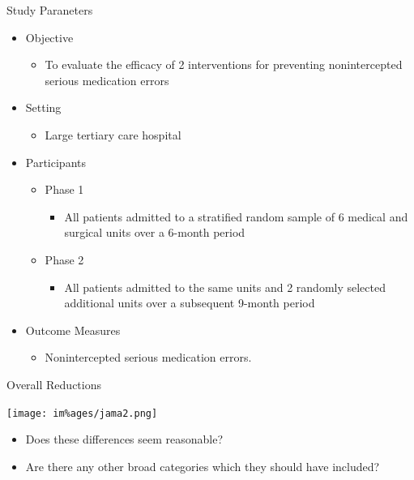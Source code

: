 \documentclass[10pt]{beamer}
\begin{document}
\begin{frame}{Study Paraneters}
	\begin{itemize}
		\item Objective
		\begin{itemize}
			\item To evaluate the efficacy of 2 interventions for preventing nonintercepted serious medication errors
		\end{itemize}
		\item Setting
		\begin{itemize}
			\item Large tertiary care hospital
		\end{itemize}
		\item Participants
		\begin{itemize}
			\item Phase 1 
			\begin{itemize}
				\item All patients admitted to a stratified random sample of 6 medical and surgical units over a 6-month period
			\end{itemize}
			\item Phase 2  
			\begin{itemize}
				\item All patients admitted to the same units and 2 randomly selected additional units over a subsequent 9-month period
			\end{itemize}
		\end{itemize}
		\item Outcome Measures
		\begin{itemize}
			\item Nonintercepted serious medication errors.
		\end{itemize}
		
	\end{itemize}
\end{frame}


\begin{frame}{Overall Reductions}
	\begin{center}
		\texttt{[image: im\%ages/jama2.png]}
	\end{center}
	
	\begin{itemize}
		\item Does these differences seem reasonable?
		\item Are there any other broad categories which they should have included?
	\end{itemize}
\end{frame}
\end{document}
